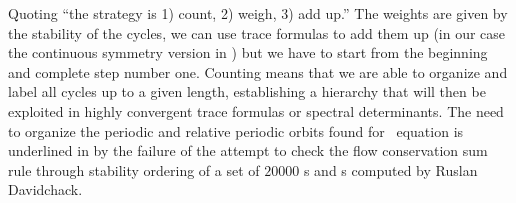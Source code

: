 Quoting  ``the strategy is 1) count, 2) weigh,
3) add up.'' The weights are given by the stability of the
cycles, we can use trace formulas to add them up (in our case
the continuous symmetry version in ) but we have to
start from the beginning and complete step number one. Counting
means that we are able to organize and label all cycles up to a
given length, establishing a hierarchy that will then be
exploited in highly convergent trace formulas or spectral
determinants. The need to organize the periodic and relative
periodic orbits found for \KS\ equation is underlined in
 by the failure of the attempt to check the
flow conservation sum rule through stability ordering of a set
of $20000$ {\po s} and {\rpo s} computed by Ruslan Davidchack.

